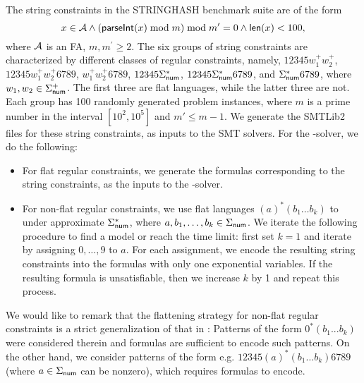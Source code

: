 The string constraints in the STRINGHASH benchmark suite are of the form 
$$x \in \mathcal{A} \wedge \left( \textsf{parseInt}(x) \bmod m \right) \bmod m^\prime = 0   \notag \wedge \textsf{len}(x) < 100,$$ 
where $\mathcal{A}$ is an FA, $m, m^\prime \ge 2.$ 
The six groups of string constraints are characterized by different classes of regular constraints, namely, $12345w^+_1 w^+_2$,  $12345 w^+_1  w^+_2 6789$, $w^+_1 w^+_2 6789$, $12345\Sigma_{\sf num}^*$, $12345\Sigma_{\sf num}^* 6789$, and $\Sigma_{\sf num}^* 6789$, where $w_1,w_2 \in \Sigma^+_{\sf num}$. The first three are flat languages, while the latter three are not. Each group has 100 randomly generated problem instances, where $m$ is a prime number in the interval $[10^2, 10^5]$ and $m' \le m-1$. We generate the SMTLib2 files for these string constraints, as inputs to the SMT solvers. For the {\paexp}-solver, we do the following:   
\begin{itemize}
\item For flat regular constraints, we generate the {\paexp} formulas corresponding to the string constraints, as the inputs to the {\paexp}-solver.
%
\item For non-flat regular constraints, we use flat languages $(a)^* (b_{1} \ldots b_{k})$ to under approximate 
$\Sigma_{\sf num}^*$,  where $a, b_1,\ldots, b_k \in \Sigma_{\sf num}$. 
%
%
We iterate the following procedure to find a model or reach the time limit: first set $k=1$ and iterate by assigning $0, \ldots, 9$ to $a$. For each assignment, we encode the resulting string constraints into the {\paexp} formulas with only one exponential variables. If the resulting {\paexp} formula is unsatisfiable, then we increase $k$ by 1 and repeat this process. 
\end{itemize}
We would like to remark that the flattening strategy for non-flat regular constraints is a strict generalization of that in \cite{Parosh:20:PLDI}: Patterns of the form $0^*(b_1...b_k)$ were considered therein and {\pa} formulas are sufficient to encode such patterns. On the other hand, we consider patterns of the form e.g. $12345 (a)^* (b_1 \ldots b_k) 6789$ (where $a \in \Sigma_{\sf num}$ can be nonzero), which requires {\paexp} formulas to encode.


